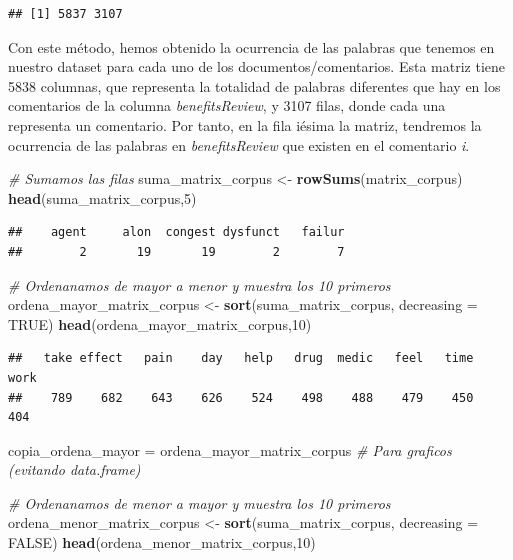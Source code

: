 \documentclass[spanish,]{article}
\newenvironment{Shaded}{\begin{snugshade}}{\end{snugshade}}
\newcommand{\KeywordTok}[1]{\textcolor[rgb]{0.13,0.29,0.53}{\textbf{#1}}}
\newcommand{\DataTypeTok}[1]{\textcolor[rgb]{0.13,0.29,0.53}{#1}}
\newcommand{\DecValTok}[1]{\textcolor[rgb]{0.00,0.00,0.81}{#1}}
\newcommand{\StringTok}[1]{\textcolor[rgb]{0.31,0.60,0.02}{#1}}
\newcommand{\CommentTok}[1]{\textcolor[rgb]{0.56,0.35,0.01}{\textit{#1}}}
\newcommand{\OtherTok}[1]{\textcolor[rgb]{0.56,0.35,0.01}{#1}}
\newcommand{\NormalTok}[1]{#1}
\begin{document}
\begin{verbatim}
## [1] 5837 3107
\end{verbatim}

Con este método, hemos obtenido la ocurrencia de las palabras que
tenemos en nuestro dataset para cada uno de los documentos/comentarios.
Esta matriz tiene 5838 columnas, que representa la totalidad de palabras
diferentes que hay en los comentarios de la columna
\textit{benefitsReview}, y 3107 filas, donde cada una representa un
comentario. Por tanto, en la fila iésima la matriz, tendremos la
ocurrencia de las palabras en \textit{benefitsReview} que existen en el
comentario \textit{i}.

\begin{Shaded}
\begin{Highlighting}[]
\CommentTok{# Sumamos las filas}
\NormalTok{suma_matrix_corpus <-}\StringTok{ }\KeywordTok{rowSums}\NormalTok{(matrix_corpus)}
\KeywordTok{head}\NormalTok{(suma_matrix_corpus,}\DecValTok{5}\NormalTok{)}
\end{Highlighting}
\end{Shaded}

\begin{verbatim}
##    agent     alon  congest dysfunct   failur 
##        2       19       19        2        7
\end{verbatim}

\begin{Shaded}
\begin{Highlighting}[]
\CommentTok{# Ordenanamos de mayor a menor y muestra los 10 primeros}
\NormalTok{ordena_mayor_matrix_corpus <-}\StringTok{ }\KeywordTok{sort}\NormalTok{(suma_matrix_corpus, }\DataTypeTok{decreasing =} \OtherTok{TRUE}\NormalTok{)}
\KeywordTok{head}\NormalTok{(ordena_mayor_matrix_corpus,}\DecValTok{10}\NormalTok{)}
\end{Highlighting}
\end{Shaded}

\begin{verbatim}
##   take effect   pain    day   help   drug  medic   feel   time   work 
##    789    682    643    626    524    498    488    479    450    404
\end{verbatim}

\begin{Shaded}
\begin{Highlighting}[]
\NormalTok{copia_ordena_mayor =}\StringTok{ }\NormalTok{ordena_mayor_matrix_corpus }\CommentTok{# Para graficos (evitando data.frame)}

\CommentTok{# Ordenanamos de menor a mayor y muestra los 10 primeros}
\NormalTok{ordena_menor_matrix_corpus <-}\StringTok{ }\KeywordTok{sort}\NormalTok{(suma_matrix_corpus, }\DataTypeTok{decreasing =} \OtherTok{FALSE}\NormalTok{)}
\KeywordTok{head}\NormalTok{(ordena_menor_matrix_corpus,}\DecValTok{10}\NormalTok{)}
\end{Highlighting}
\end{Shaded}
\end{document}
